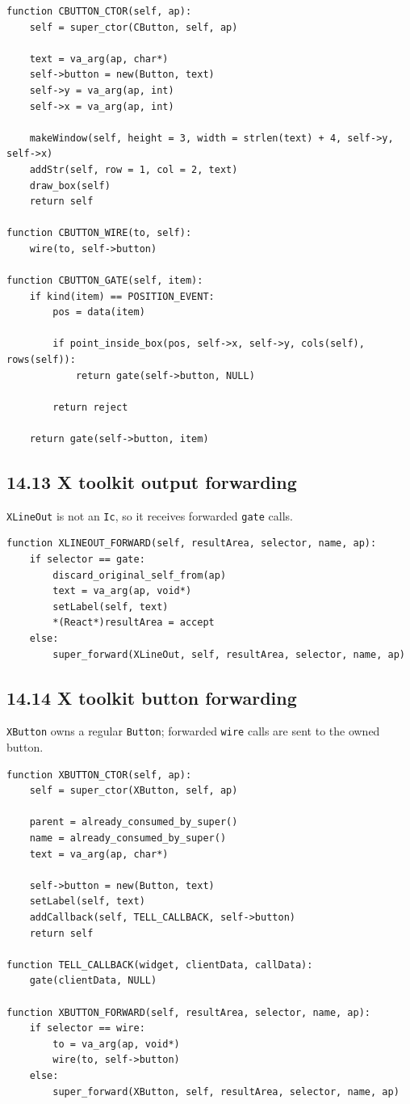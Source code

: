 \documentclass[11pt]{article}
\begin{document}
\begin{verbatim}
function CBUTTON_CTOR(self, ap):
    self = super_ctor(CButton, self, ap)

    text = va_arg(ap, char*)
    self->button = new(Button, text)
    self->y = va_arg(ap, int)
    self->x = va_arg(ap, int)

    makeWindow(self, height = 3, width = strlen(text) + 4, self->y, self->x)
    addStr(self, row = 1, col = 2, text)
    draw_box(self)
    return self

function CBUTTON_WIRE(to, self):
    wire(to, self->button)

function CBUTTON_GATE(self, item):
    if kind(item) == POSITION_EVENT:
        pos = data(item)

        if point_inside_box(pos, self->x, self->y, cols(self), rows(self)):
            return gate(self->button, NULL)

        return reject

    return gate(self->button, item)
\end{verbatim}

\subsection{14.13 X toolkit output
forwarding}\label{x-toolkit-output-forwarding}

\texttt{XLineOut} is not an
\texttt{Ic}, so it receives forwarded
\texttt{gate} calls.

\begin{verbatim}
function XLINEOUT_FORWARD(self, resultArea, selector, name, ap):
    if selector == gate:
        discard_original_self_from(ap)
        text = va_arg(ap, void*)
        setLabel(self, text)
        *(React*)resultArea = accept
    else:
        super_forward(XLineOut, self, resultArea, selector, name, ap)
\end{verbatim}

\subsection{14.14 X toolkit button
forwarding}\label{x-toolkit-button-forwarding}

\texttt{XButton} owns a regular
\texttt{Button}; forwarded
\texttt{wire} calls are sent to the owned button.

\begin{verbatim}
function XBUTTON_CTOR(self, ap):
    self = super_ctor(XButton, self, ap)

    parent = already_consumed_by_super()
    name = already_consumed_by_super()
    text = va_arg(ap, char*)

    self->button = new(Button, text)
    setLabel(self, text)
    addCallback(self, TELL_CALLBACK, self->button)
    return self

function TELL_CALLBACK(widget, clientData, callData):
    gate(clientData, NULL)

function XBUTTON_FORWARD(self, resultArea, selector, name, ap):
    if selector == wire:
        to = va_arg(ap, void*)
        wire(to, self->button)
    else:
        super_forward(XButton, self, resultArea, selector, name, ap)
\end{verbatim}
\end{document}

